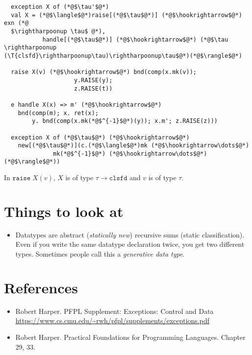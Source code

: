 \documentclass[11pt]{article}
\newcommand{\T}[1]{\ensuremath{\mathtt{#1}}}
\begin{document}
\begin{lstlisting}
  exception X of (*@$\tau'$@*)
  val X = (*@$\langle$@*)raise[(*@$\tau$@*)] (*@$\hookrightarrow$@*) exn (*@
  $\rightharpoonup \tau$ @*),
           handle[(*@$\tau$@*)] (*@$\hookrightarrow$@*) (*@$\tau \rightharpoonup
(\T{clsfd}\rightharpoonup\tau)\rightharpoonup\tau$@*)(*@$\rangle$@*)

  raise X(v) (*@$\hookrightarrow$@*) bnd(comp(x.mk(v));
                    y.RAISE(y);
                    z.RAISE(t))

  e handle X(x) => m' (*@$\hookrightarrow$@*)
    bnd(comp(m); x. ret(x);
        y. bnd(comp(x.mk(*@$^{-1}$@*)(y)); x.m'; z.RAISE(z)))

  exception X of (*@$\tau$@*) (*@$\hookrightarrow$@*)
    new[(*@$\tau$@*)](c.(*@$\langle$@*)mk (*@$\hookrightarrow\dots$@*)
              mk(*@$^{-1}$@*) (*@$\hookrightarrow\dots$@*)(*@$\rangle$@*))
\end{lstlisting}

In $\T{raise}\; X(v)$, $X$ is of type $\tau\rightarrow\T{clsfd}$ and $v$
is of type $\tau$.

\section{Things to look at}
\label{sec:look}

\begin{itemize}
\item Datatypes are abstract (\emph{statically new}) recursive sums (static
  classification).  Even if you write the same datatype declaration twice,
  you get two different types.  Sometimes people call this
  a \emph{generative data type}.
\end{itemize}

\section{References}

\begin{itemize}
\item Robert Harper. PFPL Supplement: Exceptions: Control and Data \url{https://www.cs.cmu.edu/~rwh/pfpl/supplements/exceptions.pdf}
\item Robert Harper. Practical Foundations for Programming Languages. Chapter 29, 33.
\end{itemize}
\end{document}
